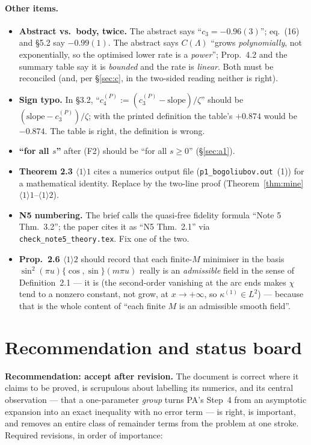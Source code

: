 \documentclass[11pt]{article}
\begin{document}
\paragraph{Other items.}
\begin{itemize}\itemsep1pt
\item \textbf{Abstract vs.\ body, twice.}  The abstract says ``$c_3=-0.96(3)$''; eq.~(16) and \S5.2
 say $-0.99(1)$.  The abstract says $C(\Lambda)$ ``grows \emph{polynomially}, not exponentially, so
 the optimised lower rate is a \emph{power}''; Prop.~4.2 and the summary table say it is
 \emph{bounded} and the rate is \emph{linear}.  Both must be reconciled (and, per \S\ref{sec:c},
 in the two-sided reading neither is right).
\item \textbf{Sign typo.}  In \S3.2, ``$c_4^{(P)}:=(c_3^{(P)}-\text{slope})/\zeta$'' should be
 $(\text{slope}-c_3^{(P)})/\zeta$; with the printed definition the table's $+0.874$ would be
 $-0.874$.  The table is right, the definition is wrong.
\item \textbf{``for all $s$''} after (F2) should be ``for all $s\ge0$'' (\S\ref{sec:a1}).
\item \textbf{Theorem 2.3 $\langle1\rangle1$} cites a numerics output file
 (\texttt{p1\_bogoliubov.out}~(1)) for a mathematical identity.  Replace by the two-line proof
 (Theorem~\ref{thm:mine} $\langle1\rangle1$--$\langle1\rangle2$).
\item \textbf{N5 numbering.}  The brief calls the quasi-free fidelity formula ``Note 5 Thm.~3.2'';
 the paper cites it as ``N5 Thm.~2.1'' via \texttt{check\_note5\_theory.tex}.  Fix one of the two.
\item \textbf{Prop.~2.6 $\langle1\rangle2$} should record that each finite-$M$ minimiser in the
 basis $\sin^2(\pi u)\{\cos,\sin\}(m\pi u)$ really is an \emph{admissible} field in the sense of
 Definition~2.1 --- it is (the second-order vanishing at the arc ends makes $\chi$ tend to a
 nonzero constant, not grow, at $x\to+\infty$, so $\kappa^{(1)}\in L^2$) --- because that is the
 whole content of ``each finite $M$ is an admissible smooth field''.
\end{itemize}

\section{Recommendation and status board}

\textbf{Recommendation: accept after revision.}  The document is correct where it claims to be
proved, is scrupulous about labelling its numerics, and its central observation --- that a
one-parameter \emph{group} turns PA's Step~4 from an asymptotic expansion into an exact inequality
with no error term --- is right, is important, and removes an entire class of remainder terms from
the problem at one stroke.  Required revisions, in order of importance:
\end{document}
